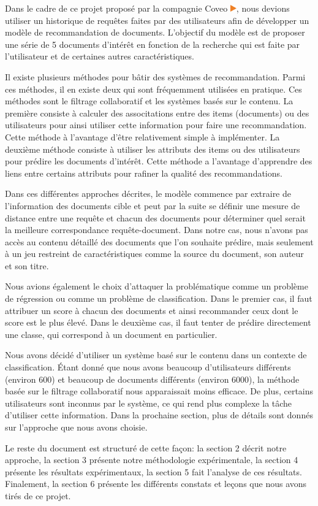 Dans le cadre de ce projet proposé par la compagnie Coveo \href{https://www.coveo.com/fr}{\includegraphics[height=0.3cm]{coveo_logo}}, nous devions utiliser un historique de requêtes faites par des utilisateurs afin de développer un modèle de recommandation de documents. 
L'objectif du modèle est de proposer une série de 5 documents d'intérêt en fonction de la recherche qui est faite par l'utilisateur et de certaines autres caractéristiques.

Il existe plusieurs méthodes pour bâtir des systèmes de recommandation. Parmi ces méthodes, il en existe deux qui sont fréquemment utilisées en pratique. Ces méthodes sont le filtrage collaboratif et les systèmes basés sur le contenu. La première consiste à calculer des associtations entre des items (documents) ou des utilisateurs pour ainsi utiliser cette information pour faire une recommandation. Cette méthode à l'avantage d'être relativement simple à implémenter. La deuxième méthode consiste à utiliser les attributs des items ou des utilisateurs pour prédire les documents d'intérêt. Cette méthode a l'avantage d'apprendre des liens entre certains attributs pour rafiner la qualité des recommandations.

Dans ces différentes approches décrites, le modèle commence par extraire de l'information des documents cible et peut par la suite se définir une mesure de distance entre une requête et chacun des documents pour déterminer quel serait la meilleure correspondance requête-document. Dans notre cas, nous n'avons pas accès au contenu détaillé des documents que l'on souhaite prédire, mais seulement à un jeu restreint de caractéristiques comme la source du document, son auteur et son titre.

Nous avions également le choix d'attaquer la problématique comme un problème de régression ou comme un problème de classification. Dans le premier cas, il faut attribuer un score à chacun des documents et ainsi recommander ceux dont le score est le plus élevé. Dans le deuxième cas, il faut tenter de prédire directement une classe, qui correspond à un document en particulier. 

Nous avons décidé d'utiliser un système basé sur le contenu dans un contexte de classification. Étant donné que nous avons beaucoup d'utilisateurs différents (environ 600) et beaucoup de documents différents (environ 6000), la méthode basée sur le filtrage collaboratif nous apparaissait moins efficace. De plus, certains utilisateurs sont inconnus par le système, ce qui rend plus complexe la tâche d'utiliser cette information. Dans la prochaine section, plus de détails sont donnés sur l'approche que nous avons choisie.

Le reste du document est structuré de cette façon: la section 2 décrit notre approche, la section 3 présente notre méthodologie expérimentale, la section 4 présente les résultats expérimentaux, la section 5 fait l'analyse de ces résultats. Finalement, la section 6 présente les différents constats et leçons que nous avons tirés de ce projet.